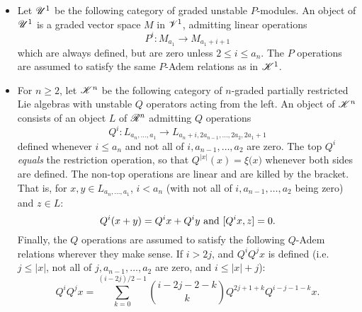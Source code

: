 \documentclass[11pt]{article}
\newcommand{\GoodLie}[1]{\mathsf{g}{\scrL}^{#1}}%
\newcommand{\PRLie}[1]{\scrR^{#1}}%
\newcommand{\LL}[1]{{\scrK}^{#1}}%
\newcommand{\GR}[1]{\scrV^{#1}}%
\newcommand{\nontop}[1]{\scrU^{#1}}%
\newcommand{\restn}[1]{\xi{#1}}
\newcommand{\LambdaOp}{Q}
\begin{document}
\begin{CategoriesOfInterest}
\begin{itemize}
\item Let $\nontop{1}$ be the following category of graded unstable $P$-modules. An object of $\nontop{1}$ is a graded vector space $M$ in $\GR{1}$,
admitting linear operations
\[P^i:M_{a_1}\to M_{a_1+i+1}\]
which are always defined, but are zero unless $2\leq i\leq a_n$.
The $P$ operations are assumed to satisfy the same $P$-Adem relations as in $\LL{1}$. %
\item For $n\geq2$, let $\LL{n}$ be the following category of $n$-graded partially restricted Lie algebras with unstable $\LambdaOp$ operators acting from the left. An object of $\LL{n}$ consists of an object $L$ of $\PRLie{n}$ 
admitting $\LambdaOp$ operations
\[\LambdaOp^i:L_{a_n,\ldots,a_1}\to L_{a_n+i,2a_{n-1},\ldots,2a_2,2a_1+1}\]
defined whenever $i\leq a_n$ and not all of $i,a_{n-1},\ldots,a_{2}$ are zero. The top $\LambdaOp^i$ \emph{equals} the restriction operation, so that $\LambdaOp^{|x|}(x)=\restn(x)$ whenever both sides are defined. The non-top operations are linear and are killed by the bracket.
That is, for $x,y\in L_{a_n,\ldots,a_1}$, $i<a_n$ (with not all of $i,a_{n-1},\ldots,a_{2}$ being zero) and $z\in L$: \[\LambdaOp^i{(x+y)}=\LambdaOp^i{x}+\LambdaOp^i{y}\textup{ and }[\LambdaOp^i{x},z]=0.\]
Finally, the $\LambdaOp$ operations are assumed to satisfy the following $\LambdaOp$-Adem relations wherever they make sense. If $i>2j$, and $\LambdaOp^i\LambdaOp^jx$ is defined (i.e.\ $j\leq|x|$, not all of $j,a_{n-1},\ldots,a_2$ are zero, and $i\leq|x|+j$):
\[\LambdaOp^i\LambdaOp^jx=\sum_{k=0}^{(i-2j)/2-1}{i-2j-2-k\choose k}\LambdaOp^{2j+1+k}\LambdaOp^{i-j-1-k}x.\]

\end{itemize}
\end{CategoriesOfInterest}
\end{document}
